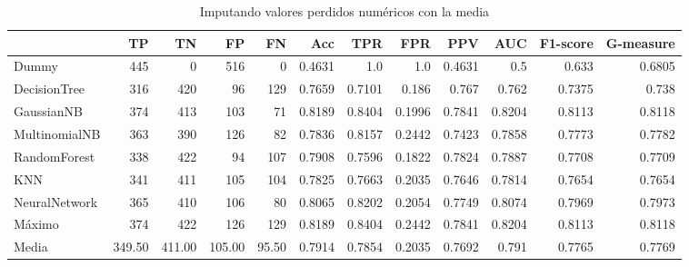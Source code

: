 \documentclass{article}
\begin{document}
\begin{table}[H]
\centering
\caption{Imputando valores perdidos numéricos con la media}
\label{tab:impute-mean}
\begin{tabular}{|lrrrrrrrrrrr|}
\hline
 & TP & TN & FP & FN & Acc & TPR & FPR & PPV & AUC & F1-score & G-measure\\ \hline
Dummy & 445 & 0 & 516 & 0 & 0.4631 & 1.0 & 1.0 & 0.4631 & 0.5 & 0.633 & 0.6805\\
DecisionTree & 316 & 420 & 96 & 129 & 0.7659 & 0.7101 & 0.186 & 0.767 & 0.762 & 0.7375 & 0.738\\
GaussianNB & 374 & 413 & 103 & 71 & 0.8189 & 0.8404 & 0.1996 & 0.7841 & 0.8204 & 0.8113 & 0.8118\\
MultinomialNB & 363 & 390 & 126 & 82 & 0.7836 & 0.8157 & 0.2442 & 0.7423 & 0.7858 & 0.7773 & 0.7782\\
RandomForest & 338 & 422 & 94 & 107 & 0.7908 & 0.7596 & 0.1822 & 0.7824 & 0.7887 & 0.7708 & 0.7709\\
KNN & 341 & 411 & 105 & 104 & 0.7825 & 0.7663 & 0.2035 & 0.7646 & 0.7814 & 0.7654 & 0.7654\\
NeuralNetwork & 365 & 410 & 106 & 80 & 0.8065 & 0.8202 & 0.2054 & 0.7749 & 0.8074 & 0.7969 & 0.7973\\ \hline
Máximo & 374 & 422 & 126 & 129 & 0.8189 & 0.8404 & 0.2442 & 0.7841 & 0.8204 & 0.8113 & 0.8118\\
Media & 349.50 & 411.00 & 105.00 & 95.50 & 0.7914 & 0.7854 & 0.2035 & 0.7692 & 0.791 & 0.7765 & 0.7769\\
\hline
\end{tabular}
\end{table}
\end{document}
